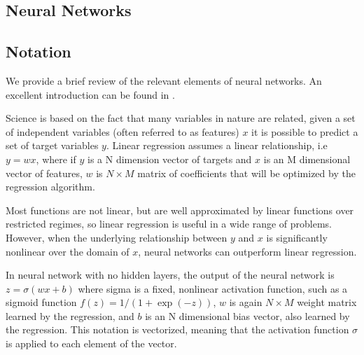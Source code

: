 \begin{refsection}

\section{Neural Networks}

\subsection{Notation}
We provide a brief review of the relevant elements of neural networks. An excellent introduction can be found in \cite{nielsen2015neural}.

Science is based on the fact that many variables in nature are related, given a set of independent variables (often referred to as features) $x$ it is possible to predict a set of target variables $y$. Linear regression assumes a linear relationship, i.e $y=wx$, where if $y$ is a N dimension vector of targets and $x$ is an M dimensional vector of features, $w$ is $N \times M$ matrix of coefficients that will be optimized by the regression algorithm.

Most functions are not linear, but are well approximated by linear functions over restricted regimes, so linear regression is useful in a wide range of problems. However, when the underlying relationship between $y$ and $x$ is significantly nonlinear over the domain of $x$, neural networks can outperform linear regression.

In neural network with no hidden layers, the output of the neural network is $z=\sigma(wx+b)$ where sigma is a fixed, nonlinear activation function, such as a sigmoid function $f(z)=1/(1+\exp(-z))$, $w$ is again $N \times M$ weight matrix learned by the regression, and $b$ is an N dimensional bias vector, also learned by the regression. This notation is vectorized, meaning that the activation function $\sigma$ is applied to each element of the vector.


\end{refsection}
